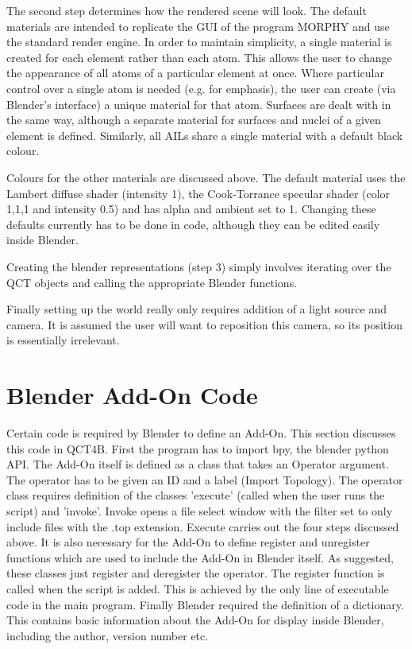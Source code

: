 \documentclass{tufte-book}
\begin{document}
The second step determines how the rendered scene will look.
The default materials are intended to replicate the GUI of the program MORPHY and use the standard render engine.
In order to maintain simplicity, a single material is created for each element rather than each atom.
This allows the user to change the appearance of all atoms of a particular element at once.
Where particular control over a single atom is needed (e.g. for emphasis), the user can create 
(via Blender's interface) a unique material for that atom.
Surfaces are dealt with in the same way, although a separate material for surfaces and nuclei of a given 
element is defined.
Similarly, all AILs share a single material with a default black colour.

Colours for the other materials are discussed above. The default material uses the Lambert diffuse shader 
(intensity 1), the Cook-Torrance specular shader (color 1,1,1 and intensity 0.5) and has alpha and ambient set to 1.
Changing these defaults currently has to be done in code, although they can be edited easily inside Blender.

Creating the blender representations (step 3) simply involves iterating over the QCT objects and calling the 
appropriate Blender functions.

Finally setting up the world really only requires addition of a light source and camera.
It is assumed the user will want to reposition this camera, so its position is essentially irrelevant.

\section{Blender Add-On Code}

Certain code is required by Blender to define an Add-On. This section discusses this code in QCT4B.
First the program has to import bpy, the blender python API.
The Add-On itself is defined as a class that takes an Operator argument.
The operator has to be given an ID 
 and a label (Import Topology).
The operator class requires definition of the classes 'execute' (called when the user runs the script)
and 'invoke'.
Invoke opens a file select window with the filter set to only include files with the .top extension.
Execute carries out the four steps discussed above.
It is also necessary for the Add-On to define register and unregister functions which are used to include the Add-On 
in Blender itself.
As suggested, these classes just register and deregister the operator. The register function is called when the 
script is added.
This is achieved by the only line of executable code in the main program.
Finally Blender required the definition of a dictionary. %
This contains basic information about the Add-On for display inside Blender, including the author, version number etc.
\end{document}
